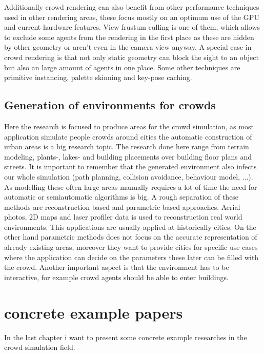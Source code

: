 \documentclass[sigconf]{acmart}
\begin{document}
Additionally crowd rendering can also benefit from other performance techniques used in other rendering areas, these focus mostly on an optimum use of the GPU and current hardware features. View frustum culling is one of them, which allows to exclude some agents from the rendering in the first place as these are hidden by other geometry or aren't even in the camera view anyway. A special case in crowd rendering is that not only static geometry can block the sight to an object but also an large amount of agents in one place. Some other techniques are primitive instancing, palette skinning and key-pose caching.     
\cite{beacco_survey_2016}

\cite{thalmann_crowd_2013}

\subsection{Generation of environments for crowds}

Here the research is focused to produce areas for the crowd simulation, as most application simulate people crowds around cities the automatic construction of urban areas is a big research topic. The research done here range from terrain modeling, plants-, lakes- and building placements over building floor plans and streets. It is important to remember that the generated environment also infects our whole simulation (path planning, collision avoidance, behaviour model, ...). 
As modelling these often large areas manually requires a lot of time the need for automatic or semiautomatic algorithms is big. A rough separation of these methods are reconstruction based and parametric based approaches. 
Aerial photos, 2D maps and laser profiler data is used to reconstruction real world environments. This applications are usually applied at historically cities. 
On the other hand parametric methods does not focus on the accurate representation of already existing areas, moreover they want to provide cities for specific use cases where the application can decide on the parameters these later can be filled with the crowd.  Another important aspect is that the environment has to be interactive, for example  crowd agents should be able to enter buildings.
\cite{thalmann_crowd_2013}

\section{concrete example papers}

In the last chapter i want to present some concrete example researches in the crowd simulation field. 
\end{document}
